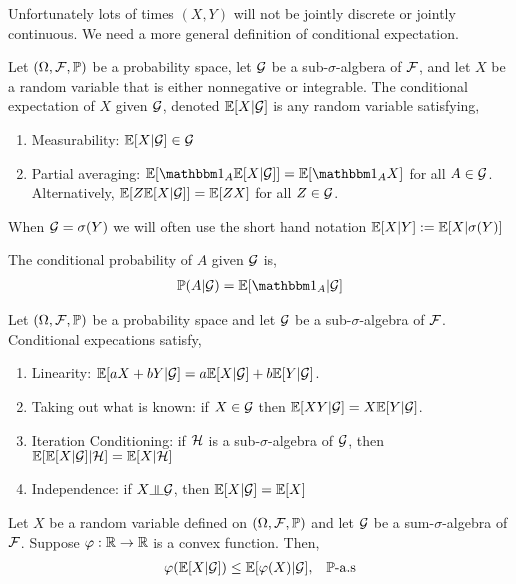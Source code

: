 \documentclass[12pt]{article}
\begin{document}
Unfortunately lots of times \( (X,Y) \) will not be jointly discrete or jointly continuous. We need a more general definition of conditional expectation.

\begin{definition}
Let \( (\Omega, \mathcal{F}, \mathbb{P}) \) be a probability space, let \( \mathcal{G} \) be a sub-\( \sigma \)-algbera of \( \mathcal{F} \), and let \( X \) be a random variable that is either nonnegative or integrable. The conditional expectation of \( X \) given \( \mathcal{G} \), denoted \( \mathbb{E}[X|\mathcal{G}] \) is any random variable satisfying,
\begin{enumerate}[nolistsep]
    \item Measurability: \( \mathbb{E}[X | \mathcal{G}] \in \mathcal{G} \)
    \item Partial averaging: \( \EE[\bOne_A \EE[X|\cG]] = \EE[\bOne_A X] \) for all \( A\in\mathcal{G} \). Alternatively, \( \mathbb{E}[Z \mathbb{E}[X|\mathcal{G}]] = \mathbb{E}[ZX] \) for all \( Z\in\mathcal{G} \).
\end{enumerate}
When \( \mathcal{G} = \sigma(Y) \) we will often use the short hand notation \( \mathbb{E}[X | Y] := \mathbb{E}[X | \sigma(Y)] \)
\end{definition}

\begin{definition}
The conditional probability of \( A \) given \( \mathcal{G} \) is,
\begin{align*}
    \PP(A | \cG) = \EE[\bOne_A | \cG]
\end{align*}
\end{definition}

\begin{theorem}
Let \( (\Omega, \mathcal{F}, \mathbb{P}) \) be a probability space and let \( \mathcal{G} \) be a sub-\( \sigma \)-algebra of \( \mathcal{F} \). Conditional expecations satisfy,
\begin{enumerate}[nolistsep]
    \item Linearity: \( \mathbb{E}[aX + bY | \mathcal{G}] = a \mathbb{E}[X|\mathcal{G}] + b \mathbb{E}[Y|\mathcal{G}] \).
    \item Taking out what is known: if \( X \in \mathcal{G} \) then \( \mathbb{E}[XY | \mathcal{G}] = X \mathbb{E}[Y | \mathcal{G}] \).
    \item Iteration Conditioning: if \( \mathcal{H} \) is a sub-\(\sigma\)-algebra of \( \mathcal{G} \), then \( \mathbb{E}[\mathbb{E}[X|\mathcal{G}]|\mathcal{H}] = \mathbb{E}[X|\mathcal{H}] \)
    \item Independence: if \( X\indep \cG \), then \( \mathbb{E}[X|\mathcal{G}] = \mathbb{E}[ X ] \)
\end{enumerate}
\end{theorem}

\begin{theorem}
    Let \( X \) be a random variable defined on \( (\Omega, \mathcal{F},\mathbb{P}) \) and let \( \mathcal{G} \) be a sum-\(\sigma\)-algebra of \( \mathcal{F} \). Suppose \( \varphi:\mathbb{R}\to\mathbb{R} \) is a convex function. Then,
    \begin{align*}
        \varphi(\mathbb{E}[X|\mathcal{G}]) \leq \mathbb{E}[\varphi(X) | \mathcal{G}], && \mathbb{P}\text{-a.s}
    \end{align*}
\end{theorem}
\end{document}
